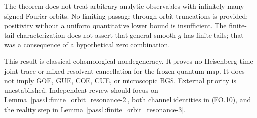 The theorem does not treat arbitrary analytic observables with infinitely many signed Fourier orbits. No limiting passage through orbit truncations is provided: positivity without a uniform quantitative lower bound is insufficient. The finite-tail characterization does not assert that general smooth \(g\) has finite tails; that was a consequence of a hypothetical zero combination.

This result is classical cohomological nondegeneracy. It proves no Heisenberg-time joint-trace or mixed-resolvent cancellation for the frozen quantum map. It does not imply GOE, GUE, COE, CUE, or microscopic BGS. External priority is unestablished. Independent review should focus on Lemma~\ref{pass1:finite_orbit_resonance-2}, both channel identities in (FO.10), and the reality step in Lemma~\ref{pass1:finite_orbit_resonance-3}.
